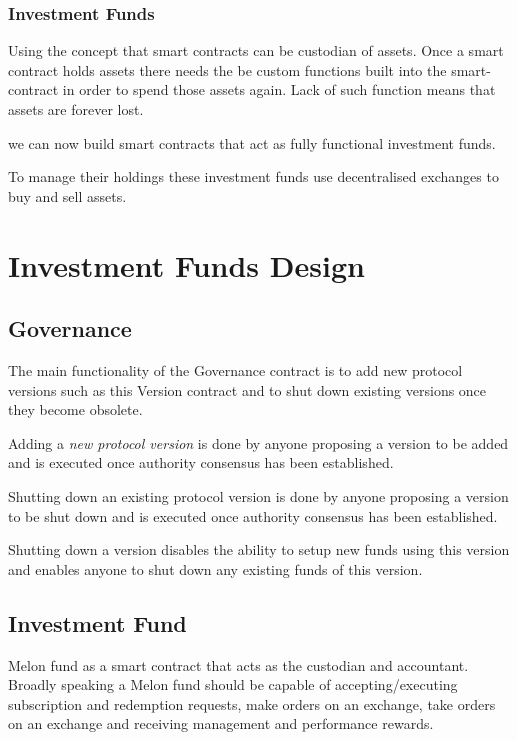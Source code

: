 \documentclass[conference]{IEEEtran}
\begin{document}
\subsubsection{Investment Funds}

Using the concept that smart contracts can be custodian of assets. Once a smart contract holds assets there needs the be custom functions built into the smart-contract in order to spend those assets again. Lack of such function means that assets are forever lost.

we can now build smart contracts that act as fully functional investment funds.

To manage their holdings these investment funds use decentralised exchanges to buy and sell assets.


\section{Investment Funds Design}

\subsection{Governance}

The main functionality of the Governance contract is to add new protocol versions such as this Version contract and to shut down existing versions once they become obsolete.

Adding a \textit{new protocol version} is done by anyone proposing a version to be added and is executed once authority consensus has been established.

Shutting down an existing protocol version is done by anyone proposing a version to be shut down and is executed once authority consensus has been established.

Shutting down a version disables the ability to setup new funds using this version and enables anyone to shut down any existing funds of this version.

\subsection{Investment Fund}

Melon fund as a smart contract that acts as the custodian and accountant. Broadly speaking a Melon fund should be capable of accepting/executing subscription and redemption requests, make orders on an exchange, take orders on an exchange and
receiving management and performance rewards.
\end{document}
